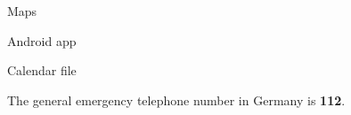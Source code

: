 \vspace*{\contentspace}%
\noindent Maps \dotfill \pageref{public-transport-map}

\enlargethispage{1\baselineskip}
\vfill
\noindent\begin{minipage}[t]{0.47\linewidth}
  \begin{center}
    Android app

  \end{center}
\end{minipage}
\hfill
\begin{minipage}[t]{0.47\linewidth}
  \begin{center}
    Calendar file

  \end{center}
\end{minipage}

\noindent
The general emergency telephone number in Germany is \textbf{112}.

\newpage
